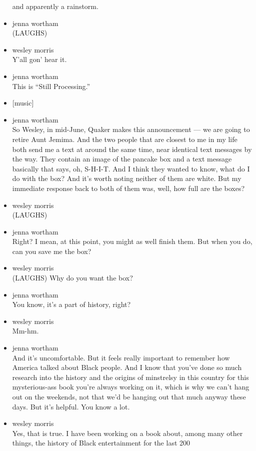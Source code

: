 \begin{itemize}
  and apparently a rainstorm.
\item
  jenna wortham\\
  (LAUGHS)
\item
  wesley morris\\
  Y'all gon' hear it.
\item
  jenna wortham\\
  This is ``Still Processing.''
\item
  {[}music{]}
\item
  jenna wortham\\
  So Wesley, in mid-June, Quaker makes this announcement --- we are
  going to retire Aunt Jemima. And the two people that are closest to me
  in my life both send me a text at around the same time, near identical
  text messages by the way. They contain an image of the pancake box and
  a text message basically that says, oh, S-H-I-T. And I think they
  wanted to know, what do I do with the box? And it's worth noting
  neither of them are white. But my immediate response back to both of
  them was, well, how full are the boxes?
\item
  wesley morris\\
  (LAUGHS)
\item
  jenna wortham\\
  Right? I mean, at this point, you might as well finish them. But when
  you do, can you save me the box?
\item
  wesley morris\\
  (LAUGHS) Why do you want the box?
\item
  jenna wortham\\
  You know, it's a part of history, right?
\item
  wesley morris\\
  Mm-hm.
\item
  jenna wortham\\
  And it's uncomfortable. But it feels really important to remember how
  America talked about Black people. And I know that you've done so much
  research into the history and the origins of minstrelsy in this
  country for this mysterious-ass book you're always working on it,
  which is why we can't hang out on the weekends, not that we'd be
  hanging out that much anyway these days. But it's helpful. You know a
  lot.
\item
  wesley morris\\
  Yes, that is true. I have been working on a book about, among many
  other things, the history of Black entertainment for the last 200

\end{itemize}
